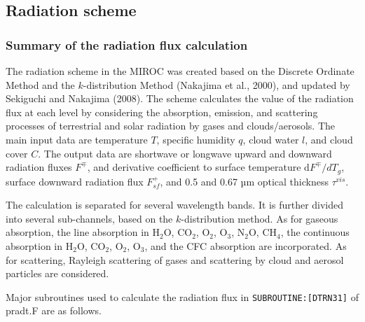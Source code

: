 \hypertarget{radiation-scheme}{%
\subsection{Radiation scheme}\label{radiation-scheme}}

\hypertarget{summary-of-the-radiation-flux-calculation}{%
\subsubsection{Summary of the radiation flux
calculation}\label{summary-of-the-radiation-flux-calculation}}

The radiation scheme in the MIROC was created based on the Discrete
Ordinate Method and the \(k\)-distribution Method (Nakajima et al.,
2000), and updated by Sekiguchi and Nakajima (2008). The scheme
calculates the value of the radiation flux at each level by considering
the absorption, emission, and scattering processes of terrestrial and
solar radiation by gases and clouds/aerosols. The main input data are
temperature \(T\), specific humidity \(q\), cloud water \(l\), and cloud
cover \(C\). The output data are shortwave or longwave upward and
downward radiation fluxes \(F^{\mp}\), and derivative coefficient to
surface temperature \(\mathrm{d}F^{\mp}/dT_{g}\), surface downward
radiation flux \(F_{sf}^{+}\), and 0.5 and 0.67 µm optical thickness
\(\tau^{vis}\).

The calculation is separated for several wavelength bands. It is further
divided into several sub-channels, based on the \(k\)-distribution
method. As for gaseous absorption, the line absorption in
\(\mathrm{H_2O}\), \(\mathrm{CO_2}\), \(\mathrm{O_2}\),
\(\mathrm{O_3}\), \(\mathrm{N_2} \mathrm{O}\), \(\mathrm{CH_4}\), the
continuous absorption in \(\mathrm{H_2} \mathrm{O}\), \(\mathrm{CO_2}\),
\(\mathrm{O_2}\), \(\mathrm{O_3}\), and the CFC absorption are
incorporated. As for scattering, Rayleigh scattering of gases and
scattering by cloud and aerosol particles are considered.

Major subroutines used to calculate the radiation flux in
\texttt{SUBROUTINE:{[}DTRN31{]}} of pradt.F are as follows.

